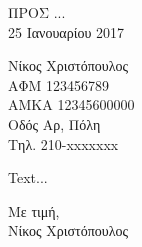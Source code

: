 \documentclass[a4paper,11pt]{article}
\title{}
\author{Nicholas Christopoulos}
\date{\today}
\begin{document}
\noindent{}ΠΡΟΣ ...\\
25 Ιανουαρίου 2017

\noindent{}Νίκος Χριστόπουλος\\
ΑΦΜ 123456789\\
ΑΜΚΑ 12345600000\\
Οδός Αρ, Πόλη\\
Τηλ. 210-xxxxxxx

Text...

\begin{flushright}
Με τιμή,\\
Νίκος Χριστόπουλος
\end{flushright}
\end{document}

